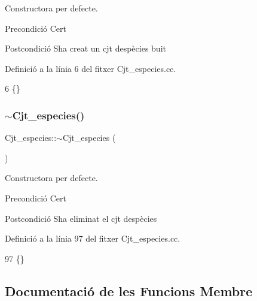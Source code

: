 Constructora per defecte. 

\begin{DoxyPrecond}{Precondició}
Cert 
\end{DoxyPrecond}
\begin{DoxyPostcond}{Postcondició}
S\textquotesingle{}ha creat un cjt d\textquotesingle{}espècies buit 
\end{DoxyPostcond}


Definició a la línia 6 del fitxer Cjt\+\_\+especies.\+cc.


\begin{DoxyCode}
6 \{\}
\end{DoxyCode}
\mbox{\label{class_cjt__especies_a05182978f6fff11a0fa1cec49514dd5e}} 
\subsubsection{\texorpdfstring{$\sim$\+Cjt\+\_\+especies()}{~Cjt\_especies()}}
{\footnotesize\ttfamily Cjt\+\_\+especies\+::$\sim$\+Cjt\+\_\+especies (\begin{DoxyParamCaption}{ }\end{DoxyParamCaption})}



Constructora per defecte. 

\begin{DoxyPrecond}{Precondició}
Cert 
\end{DoxyPrecond}
\begin{DoxyPostcond}{Postcondició}
S\textquotesingle{}ha eliminat el cjt d\textquotesingle{}espècies 
\end{DoxyPostcond}


Definició a la línia 97 del fitxer Cjt\+\_\+especies.\+cc.


\begin{DoxyCode}
97 \{\}
\end{DoxyCode}


\subsection{Documentació de les Funcions Membre}
\mbox{\label{class_cjt__especies_a542ea997b387b5bac131ba7bcb23aec3}} 
